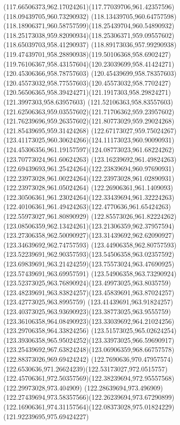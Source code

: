 {{  \curveto(117.66506373,962.17024261)(117.77039706,961.42357596)(118.09439705,960.73290932)
  \curveto(118.13439705,960.64757598)(118.18906371,960.58757599)(118.25439704,960.54890932)
  \curveto(118.25173038,959.82090934)(118.25306371,959.09557602)(118.65039703,958.41290937)
  \curveto(118.89173036,957.99290938)(119.47439701,958.28890938)(119.50106368,958.6902427)
  \curveto(119.76106367,958.43157604)(120.23039699,958.41424271)(120.45306366,958.78757603)
  \curveto(120.45439699,958.78357603)(120.45573032,958.77557603)(120.45573032,958.7702427)
  \curveto(120.56506365,958.39424271)(121.1917303,958.29824271)(121.3997303,958.63957603)
  \curveto(121.52106363,958.83557603)(121.62506363,959.03557602)(121.71706362,959.23957602)
  \curveto(121.76239696,959.26357602)(121.80773029,959.29024268)(121.85439695,959.31424268)
  \curveto(122.67173027,959.75024267)(123.41173025,960.30624266)(124.11173023,960.90090931)
  \curveto(124.45306356,961.19157597)(124.08773023,961.68224262)(123.70773024,961.60624263)
  \curveto(123.16239692,961.49824263)(122.69439693,961.25424264)(122.23839694,960.97690931)
  \curveto(122.23973028,961.00224264)(122.23973028,961.02890931)(122.23973028,961.05024264)
  \curveto(122.26906361,961.1409093)(122.30506361,961.23024264)(122.33439694,961.32224263)
  \curveto(122.40106361,961.49424263)(122.4770636,961.65424263)(122.55973027,961.80890929)
  \curveto(122.85573026,961.82224262)(123.08506359,962.13424261)(123.21306359,962.37957594)
  \curveto(123.27306358,962.50090927)(123.31439692,962.62090927)(123.34639692,962.74757593)
  \curveto(123.44906358,962.80757593)(123.52239691,962.90357593)(123.54506358,963.02357592)
  \curveto(123.69839691,963.21424259)(123.75573024,963.47690925)(123.57439691,963.69957591)
  \curveto(123.54906358,963.73290924)(123.52373025,963.76890924)(123.49973025,963.8035759)
  \curveto(123.48239691,963.83824257)(123.45839691,963.87024257)(123.42773025,963.8995759)
  \curveto(123.41439691,963.91824257)(123.40373025,963.93690923)(123.38773025,963.9555759)
  \curveto(123.36106358,964.08490923)(123.33039692,964.21024256)(123.29706358,964.33824256)
  \curveto(123.51573025,965.02624254)(123.39306358,965.95024252)(123.33973025,966.59690917)
  \curveto(123.25439692,967.63824248)(123.06906359,968.66757578)(122.88373026,969.69424242)
  \curveto(122.7690636,970.47957574)(122.6530636,971.26624239)(122.53173027,972.0515757)
  \curveto(122.45706361,972.50357569)(122.38239694,972.95557568)(122.29973028,973.404909)
  \curveto(122.28639694,973.496909)(122.27439694,973.58357566)(122.26239694,973.67290899)
  \curveto(122.16906361,974.31157564)(122.08373028,975.01824229)(121.92239695,975.69424227)
}}
